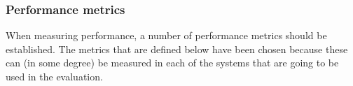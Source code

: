 \subsubsection{Performance metrics} %
\label{ssub:performance_metrics_discussion}

When measuring performance, a number of performance metrics should be established. The metrics that are defined below have been chosen because these can (in some degree) be measured in each of the systems that are going to be used in the evaluation.

